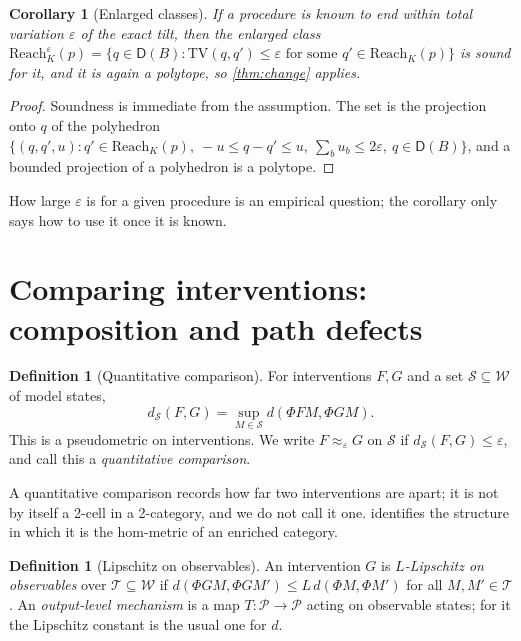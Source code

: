 \documentclass[11pt]{article}
\newtheorem{corollary}[theorem]{Corollary}
\theoremstyle{definition}
\newtheorem{definition}[theorem]{Definition}
\theoremstyle{remark}
\newcommand{\D}{\mathsf{D}}
\newcommand{\TV}{\mathrm{TV}}
\newcommand{\Reach}{\mathrm{Reach}}
\newcommand{\cP}{\mathcal{P}}
\newcommand{\cW}{\mathcal{W}}
\newcommand{\cS}{\mathcal{S}}
\begin{document}
\begin{corollary}[Enlarged classes]\label{cor:enlarge}
If a procedure is known to end within total variation $\varepsilon$ of the exact tilt, then the
enlarged class $\Reach^\varepsilon_K(p)=\{q\in\D(B):\TV(q,q')\le\varepsilon\text{ for some }q'\in
\Reach_K(p)\}$ is sound for it, and it is again a polytope, so \cref{thm:change} applies.
\end{corollary}
\begin{proof}
Soundness is immediate from the assumption. The set is the projection onto $q$ of the polyhedron
$\{(q,q',u):q'\in\Reach_K(p),\ -u\le q-q'\le u,\ \sum_bu_b\le2\varepsilon,\ q\in\D(B)\}$, and a bounded
projection of a polyhedron is a polytope.
\end{proof}

How large $\varepsilon$ is for a given procedure is an empirical question; the corollary only says how to
use it once it is known.

\section{Comparing interventions: composition and path defects}\label{sec:composition}

\begin{definition}[Quantitative comparison]\label{def:comparison}
For interventions $F,G$ and a set $\cS\subseteq\cW$ of model states,
\[
d_\cS(F,G)=\sup_{M\in\cS}d(\Phi FM,\Phi GM).
\]
This is a pseudometric on interventions. We write $F\approx_\varepsilon G$ on $\cS$ if
$d_\cS(F,G)\le\varepsilon$, and call this a \emph{quantitative comparison}.
\end{definition}

A quantitative comparison records how far two interventions are apart; it is not by itself a 2-cell
in a 2-category, and we do not call it one.  identifies the structure in which it is
the hom-metric of an enriched category.

\begin{definition}[Lipschitz on observables]
An intervention $G$ is \emph{$L$-Lipschitz on observables} over $\mathcal{T}\subseteq\cW$ if
$d(\Phi GM,\Phi GM')\le L\,d(\Phi M,\Phi M')$ for all $M,M'\in\mathcal T$. An \emph{output-level
mechanism} is a map $T\colon\cP\to\cP$ acting on observable states; for it the Lipschitz constant is the
usual one for $d$.
\end{definition}
\end{document}

